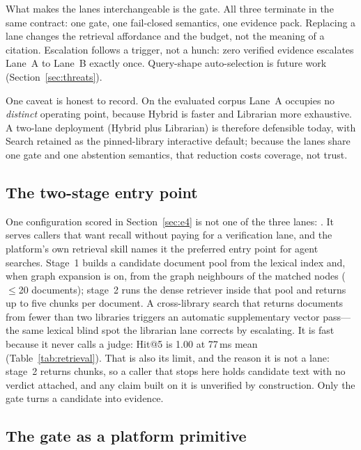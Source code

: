 What makes the lanes interchangeable is the gate. All three terminate in the same
contract: one gate, one fail-closed semantics, one evidence pack. Replacing a
lane changes the retrieval affordance and the budget, not the meaning of a
citation. Escalation follows a trigger, not a hunch: zero verified evidence
escalates Lane~A to Lane~B exactly once. Query-shape auto-selection is future
work (Section~\ref{sec:threats}).

One caveat is honest to record. On the evaluated corpus Lane~A occupies no
\emph{distinct} operating point, because Hybrid is faster and Librarian more
exhaustive. A two-lane deployment (Hybrid plus Librarian) is therefore defensible
today, with Search retained as the pinned-library interactive default; because
the lanes share one gate and one abstention semantics, that reduction costs
coverage, not trust.

\subsection{The two-stage entry point}
\label{sec:twostage}

One configuration scored in Section~\ref{sec:e4} is not one of the three lanes:
.
It serves callers that want recall without paying for a verification lane, and
the platform's own retrieval skill names it the preferred entry point for agent
searches. Stage~1 builds a candidate document pool from the lexical index and,
when graph expansion is on, from the graph neighbours of the matched nodes
($\leq$20 documents); stage~2 runs the dense retriever inside that pool and
returns up to five chunks per document. A cross-library search that returns
documents from fewer than two libraries triggers an automatic supplementary
vector pass---the same lexical blind spot the librarian lane corrects by
escalating. It is fast because it never calls a judge: Hit@5 is 1.00 at 77\,ms
mean (Table~\ref{tab:retrieval}). That is also its limit, and the reason it is
not a lane: stage~2 returns chunks, so a caller that stops here holds candidate
text with no verdict attached, and any claim built on it is unverified by
construction. Only the gate turns a candidate into evidence.

\subsection{The gate as a platform primitive}
\label{sec:gate-primitive}

